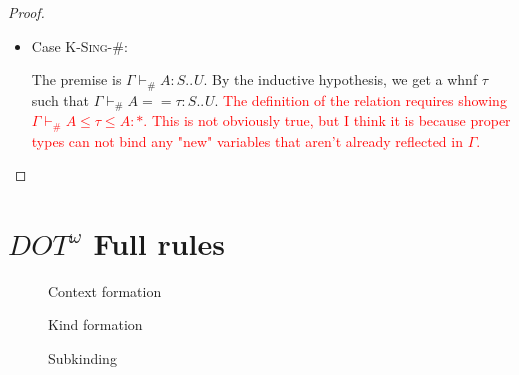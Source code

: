 \documentclass[a4paper, 10pt]{article}
\newcommand{\DOTw}{\ensuremath{DOT^\omega}}
\newcommand{\interval}[3][]{#2 .._{#1} #3}
\newcommand{\isctx}[1]{#1\ \texttt{ctx}}
\newcommand{\iskd}[1]{#1\ \texttt{kd}}
\newcommand{\TyKd}{*}
\newcommand{\KDepArr}[3]{\Pi(#1:#2).#3}
\theoremstyle{definition}
\begin{document}
\begin{proof}
\begin{itemize}
    \item Case \textsc{K-Sing-\#}:

      The premise is $\Gamma \vdash_\# A : \interval{S}{U}$. By the inductive
      hypothesis, we get a whnf $\tau$ such that $\Gamma \vdash_\# A == \tau :
      \interval{S}{U}$. \textcolor{red}{The definition of the relation requires
      showing $\Gamma \vdash_\# A \le \tau \le A: \TyKd$. This is not obviously
      true, but I think it is because proper types can not bind any "new"
      variables that aren't already reflected in $\Gamma$.}
  \end{itemize}
\end{proof}

\newpage
\appendix

\section{$\DOTw$ Full rules}\label{appendix:dotw-rules}

\begin{figure}[ht]
  \caption{Context formation}
\end{figure}

\begin{figure}[ht]
  \caption{Kind formation}
\end{figure}

\begin{figure}[ht]
  \caption{Subkinding}
\end{figure}
\end{document}
